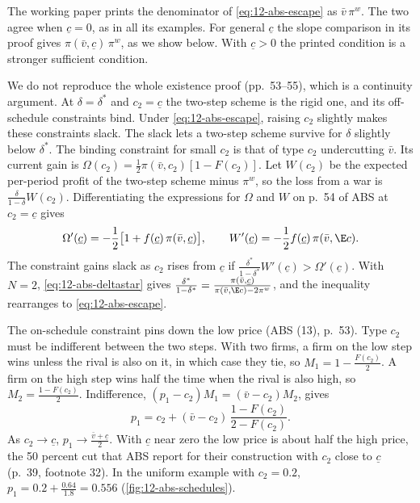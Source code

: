 The working paper prints the denominator of \eqref{eq:12-abs-escape} as $\bar v\,\pi^w$. The two agree when
$\underline c = 0$, as in all its examples. For general $\underline c$ the slope comparison in its proof gives
$\pi(\bar v, \underline c)\,\pi^w$, as we show below. With $\underline c > 0$ the printed condition is a stronger
sufficient condition.

We do not reproduce the whole existence proof (pp.~53--55), which is a continuity argument. At $\delta = \delta^*$ and
$c_2 = \underline c$ the two-step scheme is the rigid one, and its off-schedule constraints bind. Under
\eqref{eq:12-abs-escape}, raising $c_2$ slightly makes these constraints slack. The slack lets a two-step scheme
survive for $\delta$ slightly below $\delta^*$. The binding constraint for small $c_2$ is that of type $c_2$
undercutting $\bar v$. Its current gain is $\Omega(c_2) = \frac{1}{2}\pi(\bar v, c_2)[1 - F(c_2)]$. Let $W(c_2)$
be the expected per-period profit of the two-step scheme minus $\pi^w$, so the loss from a war is
$\frac{\delta}{1-\delta}W(c_2)$. Differentiating the expressions for $\Omega$ and $W$ on p.~54 of ABS at
$c_2 = \underline c$ gives
\begin{equation*}
\Omega'(\underline c) = -\frac{1}{2}\bigl[1 + f(\underline c)\,\pi(\bar v, \underline c)\bigr],
\qquad
W'(\underline c) = -\frac{1}{2}f(\underline c)\,\pi(\bar v, \E c) .
\end{equation*}
The constraint gains slack as $c_2$ rises from $\underline c$ if $\frac{\delta^*}{1-\delta^*}W'(\underline c) >
\Omega'(\underline c)$. With $N = 2$, \eqref{eq:12-abs-deltastar} gives
$\frac{\delta^*}{1-\delta^*} = \frac{\pi(\bar v, \underline c)}{\pi(\bar v, \E c) - 2\pi^w}$, and the inequality
rearranges to \eqref{eq:12-abs-escape}.

The on-schedule constraint pins down the low price (ABS (13), p.~53). Type $c_2$ must be indifferent between the two
steps. With two firms, a firm on the low step wins unless the rival is also on it, in which case they tie, so
$M_1 = 1 - \frac{F(c_2)}{2}$. A firm on the high step wins half the time when the rival is also high, so
$M_2 = \frac{1 - F(c_2)}{2}$. Indifference, $(p_1 - c_2)M_1 = (\bar v - c_2)M_2$, gives
\begin{equation}\label{eq:12-abs-p1}
p_1 = c_2 + (\bar v - c_2)\,\frac{1 - F(c_2)}{2 - F(c_2)} .
\end{equation}
As $c_2 \to \underline c$, $p_1 \to \frac{\bar v + \underline c}{2}$. With $\underline c$ near zero the low price is
about half the high price, the 50 percent cut that ABS report for their construction with $c_2$ close to $\underline c$
(p.~39, footnote 32). In the uniform example with $c_2 = 0.2$, $p_1 = 0.2 + \frac{0.64}{1.8} = 0.556$
(\cref{fig:12-abs-schedules}).

